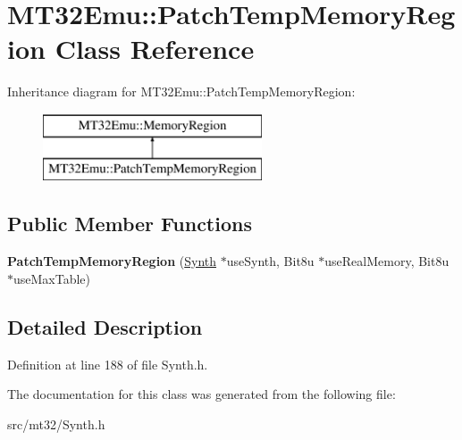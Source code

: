 \hypertarget{classMT32Emu_1_1PatchTempMemoryRegion}{\section{M\-T32\-Emu\-:\-:Patch\-Temp\-Memory\-Region Class Reference}
\label{classMT32Emu_1_1PatchTempMemoryRegion}
}
Inheritance diagram for M\-T32\-Emu\-:\-:Patch\-Temp\-Memory\-Region\-:\begin{figure}[H]
\begin{center}
\leavevmode
\includegraphics[height=2.000000cm]{classMT32Emu_1_1PatchTempMemoryRegion}
\end{center}
\end{figure}
\subsection*{Public Member Functions}
\begin{DoxyCompactItemize}
\item 
\hypertarget{classMT32Emu_1_1PatchTempMemoryRegion_af755be6eddf48833ea8de3db2f8493da}{{\bfseries Patch\-Temp\-Memory\-Region} (\hyperlink{classMT32Emu_1_1Synth}{Synth} $\ast$use\-Synth, Bit8u $\ast$use\-Real\-Memory, Bit8u $\ast$use\-Max\-Table)}\label{classMT32Emu_1_1PatchTempMemoryRegion_af755be6eddf48833ea8de3db2f8493da}

\end{DoxyCompactItemize}


\subsection{Detailed Description}


Definition at line 188 of file Synth.\-h.



The documentation for this class was generated from the following file\-:\begin{DoxyCompactItemize}
\item 
src/mt32/Synth.\-h\end{DoxyCompactItemize}

